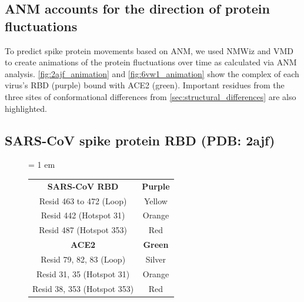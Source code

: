 \FloatBarrier
{}
\subsection{ANM accounts for the direction of protein fluctuations}

To predict spike protein movements based on ANM, we used NMWiz and VMD to create animations of the protein fluctuations over time as calculated via ANM analysis. \autoref{fig:2ajf_animation} and \autoref{fig:6vw1_animation} show the complex of each virus's RBD (purple) bound with ACE2 (green). Important residues from the three sites of conformational differences from \autoref{sec:structural_differences} are also highlighted.

\FloatBarrier
{}
\subsection{SARS-CoV spike protein RBD (PDB: 2ajf)}

\begin{figure}[h]
	\centering
	\tabcolsep = 1 em
	\mySfFamily
	\begin{tabular}{c c }
		\textbf{SARS-CoV RBD} & \textbf{Purple} \\
		Resid 463 to 472 (Loop)  & Yellow \\
		Resid 442 (Hotspot 31)  & Orange \\
		Resid 487 (Hotspot 353)  & Red \\
		\textbf{ACE2}  & \textbf{Green} \\
		Resid 79, 82, 83 (Loop) & Silver \\
		Resid 31, 35 (Hotspot 31) & Orange \\
		Resid 38, 353 (Hotspot 353) & Red \\
	\end{tabular}
	\caption{}
	\label{fig:2ajf_B&F_table}
\end{figure}

